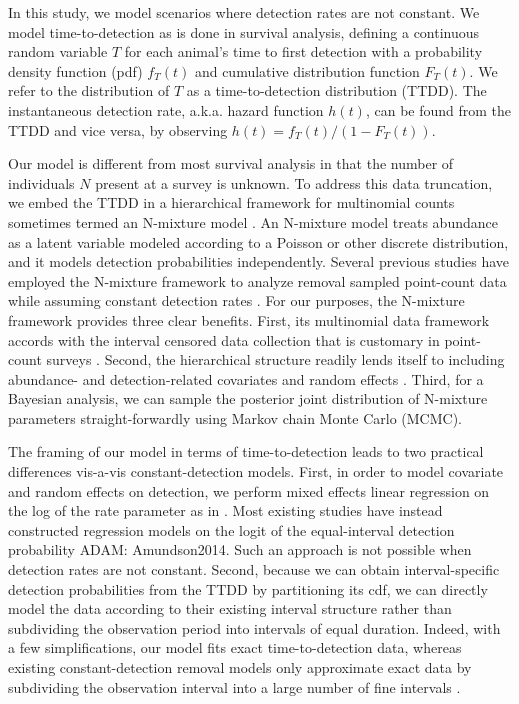 \documentclass[useAMS,usenatbib,referee,12pt]{article}
\newcommand{\adam}[1]{{\color{blue} ADAM: #1}}
\begin{document}
In this study, we model scenarios where detection rates are not constant.  We model time-to-detection as is done in survival analysis, defining a continuous random variable $T$ for each animal's time to first detection with a probability density function (pdf) $f_T(t)$ and cumulative distribution function $F_T(t)$.  We refer to the distribution of $T$ as a time-to-detection distribution (TTDD).  The instantaneous detection rate, a.k.a. hazard function $h(t)$, can be found from the TTDD and vice versa, by observing $h(t) = f_T(t) / (1-F_T(t))$.

Our model is different from most survival analysis in that the number of individuals $N$ present at a survey is unknown.  To address this data truncation, we embed the TTDD in a hierarchical framework for multinomial counts sometimes termed an N-mixture model \citep{Wyatt2002, Royle2004NMixture}.  An N-mixture model treats abundance as a latent variable modeled according to a Poisson or other discrete distribution, and it models detection probabilities independently.  Several previous studies have employed the N-mixture framework to analyze removal sampled point-count data while assuming constant detection rates \citep{Royle2004Generalized, Dorazio2005, Etterson2009, Solymos2013, Amundson2014}.  For our purposes, the N-mixture framework provides three clear benefits.  First, its multinomial data framework accords with the interval censored data collection that is customary in point-count surveys \citep{Ralph1995}.  Second, the hierarchical structure readily lends itself to including abundance- and detection-related covariates and random effects \citep{Dorazio2005, Etterson2009, Amundson2014}.  Third, for a Bayesian analysis, we can sample the posterior joint distribution of N-mixture parameters straight-forwardly using Markov chain Monte Carlo (MCMC).

The framing of our model in terms of time-to-detection leads to two practical differences vis-a-vis constant-detection models.  First, in order to model covariate and random effects on detection, we perform mixed effects linear regression on the log of the rate parameter as in \citet{Solymos2013}.  Most existing studies have instead constructed regression models on the logit of the equal-interval detection probability \adam{Amundson2014}.  Such an approach is not possible when detection rates are not constant.  Second, because we can obtain interval-specific detection probabilities from the TTDD by partitioning its cdf, we can directly model the data according to their existing interval structure rather than subdividing the observation period into intervals of equal duration.  Indeed, with a few simplifications, our model fits exact time-to-detection data, whereas existing constant-detection removal models only approximate exact data by subdividing the observation interval into a large number of fine intervals \citep{Reidy2011, Amundson2014}.
\end{document}
